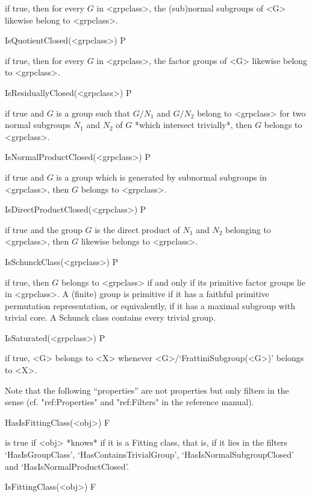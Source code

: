 if true, then for every $G$ in <grpclass>, the (sub)normal subgroups of <G>
likewise belong to <grpclass>.

\> IsQuotientClosed(<grpclass>) P

if true, then for every $G$ in <grpclass>, the factor groups of <G>
likewise belong to <grpclass>.

\> IsResiduallyClosed(<grpclass>) P

if true and $G$ is a group such that $G/N_1$ and $G/N_2$ belong to
<grpclass> for two normal subgroups $N_1$ and $N_2$ of $G$ *which intersect
trivially*, then $G$ belongs to <grpclass>.

\> IsNormalProductClosed(<grpclass>) P

if true and $G$ is a group which is generated by subnormal subgroups in <grpclass>,
then $G$ belongs to <grpclass>.

\> IsDirectProductClosed(<grpclass>) P

if true and the group $G$ is the direct product of $N_1$ and
$N_2$ belonging to <grpclass>, then $G$ likewise belongs to
<grpclass>.

\> IsSchunckClass(<grpclass>) P

if true, then $G$ belongs to <grpclass> if and only if its primitive
factor groups lie in <grpclass>. A (finite) group is primitive if it has a
faithful primitive permutation representation, or equivalently, if it has a
maximal subgroup with trivial core. A Schunck class contains every trivial
group. 

\>IsSaturated(<grpclass>) P

if true, <G> belongs to <X> whenever <G>/`FrattiniSubgroup(<G>)' belongs to
<X>.


\null


Note that the following ``properties'' are not properties but only filters in
the {\GAP} sense (cf. "ref:Properties" and "ref:Filters" in the {\GAP}
reference manual).

\>HasIsFittingClass(<obj>) F

is true if <obj> *knows* if it is a Fitting class, that is, if it lies in the
filters  `HasIsGroupClass', `HasContainsTrivialGroup',
`HasIsNormalSubgroupClosed'  and `HasIsNormalProductClosed'.

\>IsFittingClass(<obj>) F

